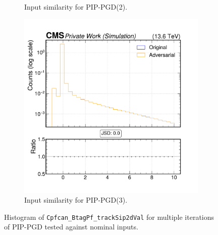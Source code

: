 \begin{figure}[h]
\begin{subfigure}[t]{0.32\textwidth}
    \caption*{Input similarity for PIP-PGD(2).}
  \end{subfigure}\hfill
  \begin{subfigure}[t]{0.32\textwidth}
    \includegraphics[width=\linewidth]{media/output/features/compare/combined_it_3/cmp_cpf_arr_Cpfcan_BtagPf_trackSip2dVal.pdf}
    \caption*{Input similarity for PIP-PGD(3).}
  \end{subfigure}

  \caption*{Histogram of \texttt{Cpfcan\_BtagPf\_trackSip2dVal} for multiple iterations of PIP-PGD tested against nominal inputs.}
  \label{fig:combined_input_Cpfcan_BtagPf_trackSip2dVal}
\end{figure}

